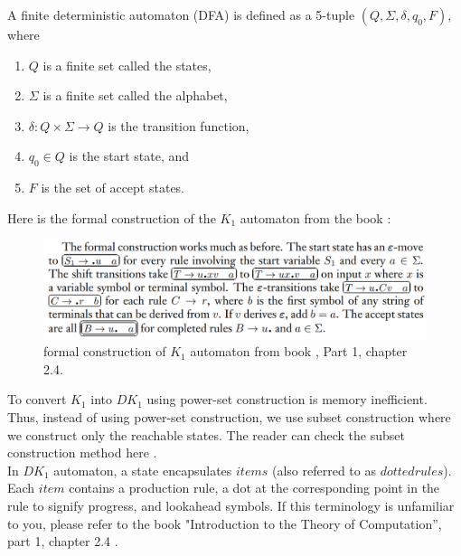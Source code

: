 \begin{definition}[2.0]
    A finite deterministic automaton (DFA) is defined as a 5-tuple  \((Q, \Sigma, \delta, q_{0}, F)\), where
    \begin{enumerate}
        \item \(Q\) is a finite set called the states,
        \item \(\Sigma\) is a finite set called the alphabet,
        \item \(\delta : Q \times \Sigma \to Q\) is the transition function,
        \item \(q_{0} \in Q\) is the start state, and
        \item \(F\) is the set of accept states.
    \end{enumerate}
\end{definition}
\setlength{\parindent}{0pt}

\vspace{10pt}

Here is the formal construction of the \( K_{1}\) automaton from the book \cite{sipser}:


\begin{figure}[h!]
    \includegraphics[width=\linewidth]{DK1 formal specification.png}
    \caption{formal construction of \(K_{1}\) automaton from book \cite{sipser}, Part 1, chapter 2.4.}
    \label{figure 2}
\end{figure}

\vspace{15pt}

To convert \(K_{1}\) into \(DK_{1}\) using power-set construction is memory inefficient. Thus, instead of using power-set construction, we use subset construction where we construct only the reachable states. The reader can check the subset construction method here \cite{DFA}.\\

In \( DK_{1} \) automaton, a state encapsulates \(items\) (also referred to as \(dotted rules\)). Each \(item\) contains a production rule, a dot at the corresponding point in the rule to signify progress, and lookahead symbols. If this terminology is unfamiliar to you, please refer to the book "Introduction to the Theory of Computation”, part 1, chapter 2.4 \cite{sipser}.\\

